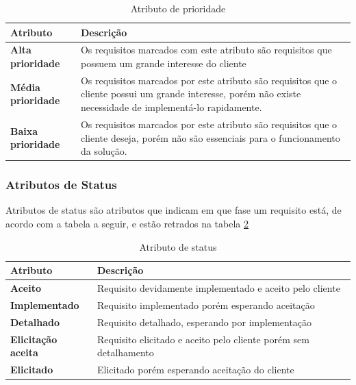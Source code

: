 \begin{table}[H]
\begin{tabular}{|p{4cm}|p{11cm}|}

\hline
\textbf{Atributo} &
\textbf{Descrição}
\\ \hline

\textbf{Alta prioridade} &
Os requisitos marcados com este atributo são requisitos que possuem um grande interesse do cliente
\\ \hline

\textbf{Média prioridade} &
Os requisitos marcados por este atributo são requisitos que o cliente possui um grande interesse, porém não existe necessidade de implementá-lo rapidamente.
\\ \hline

\textbf{Baixa prioridade} &
Os requisitos marcados por este atributo são requisitos que o cliente deseja, porém não são essenciais para o funcionamento da solução.
\\ \hline

\end{tabular}
\caption{Atributo de prioridade}
\label{tab:atributo_prioridade}
\end{table}

\subsubsection{Atributos de Status\\}

Atributos de status são atributos que indicam em que fase um requisito está, de acordo com a tabela a seguir, e estão retrados na tabela \ref{tab:atributo_status}

\begin{table}[h]
\begin{tabular}{|p{4cm}|p{11cm}|}

\hline
\textbf{Atributo} &
\textbf{Descrição}
\\ \hline

\textbf{Aceito} &
Requisito devidamente implementado e aceito pelo cliente
\\ \hline

\textbf{Implementado} &
Requisito implementado porém esperando aceitação
\\ \hline

\textbf{Detalhado} &
Requisito detalhado, esperando por implementação
\\ \hline

\textbf{Elicitação aceita} &
Requisito elicitado e aceito pelo cliente porém sem detalhamento
\\ \hline

\textbf{Elicitado} &
Elicitado porém esperando aceitação do cliente
\\ \hline

\end{tabular}
\caption{Atributo de status}
\label{tab:atributo_status}
\end{table}